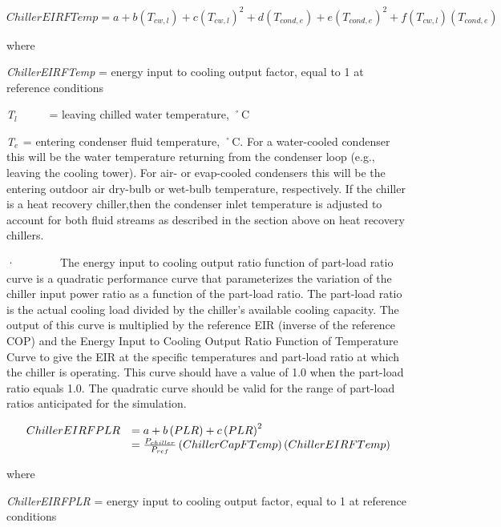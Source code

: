 \begin{equation}
ChillerEIRFTemp = a + b\left( {{T_{cw,l}}} \right) + c{\left( {{T_{cw,l}}} \right)^2} + d\left( {{T_{cond,e}}} \right) + e{\left( {{T_{cond,e}}} \right)^2} + f\left( {{T_{cw,l}}} \right)\left( {{T_{cond,e}}} \right)
\end{equation}

where

\emph{ChillerEIRFTemp} = energy input to cooling output factor, equal to 1 at reference conditions

\emph{T\(_{l}\)}~~~~~ = leaving chilled water temperature, ˚C

\emph{T\(_{e}\)}\(_{ }\) = entering condenser fluid temperature, ˚C. For a water-cooled condenser this will be the water temperature returning from the condenser loop (e.g., leaving the cooling tower). For air- or evap-cooled condensers this will be the entering outdoor air dry-bulb or wet-bulb temperature, respectively. If the chiller is a heat recovery chiller,then the condenser inlet temperature is adjusted to account for both fluid streams as described in the section above on heat recovery chillers.

·~~~~~~~~The energy input to cooling output ratio function of part-load ratio curve is a quadratic performance curve that parameterizes the variation of the chiller input power ratio as a function of the part-load ratio. The part-load ratio is the actual cooling load divided by the chiller's available cooling capacity. The output of this curve is multiplied by the reference EIR (inverse of the reference COP) and the Energy Input to Cooling Output Ratio Function of Temperature Curve to give the EIR at the specific temperatures and part-load ratio at which the chiller is operating. This curve should have a value of 1.0 when the part-load ratio equals 1.0. The quadratic curve should be valid for the range of part-load ratios anticipated for the simulation.

\begin{equation}
  \begin{array}{rl}
    ChillerEIRFPLR &= a + b\PB{PLR} + c\PB{PLR}^2\\
                   &= \frac{P_{chiller}}{P_{ref}}\left( {ChillerCapFTemp} \right)\left( {ChillerEIRFTemp} \right)
  \end{array}
\end{equation}

where

\emph{ChillerEIRFPLR} = energy input to cooling output factor, equal to 1 at reference conditions

